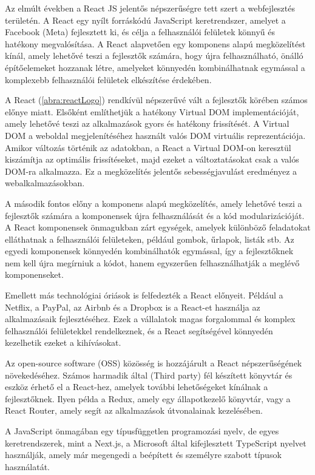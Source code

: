 Az elmúlt években a React JS jelentős népszerűségre tett szert a webfejlesztés területén. A React egy nyílt forráskódú JavaScript keretrendszer, amelyet a Facebook (Meta) fejlesztett ki, és célja a felhasználói felületek könnyű és hatékony megvalósítása. A React alapvetően egy komponens alapú megközelítést kínál, amely lehetővé teszi a fejlesztők számára, hogy újra felhasználható, önálló építőelemeket hozzanak létre, amelyeket könnyedén kombinálhatnak egymással a komplexebb felhasználói felületek elkészítése érdekében.

A React (\ref{abra:reactLogo}) rendkívül népszerűvé vált a fejlesztők körében számos előnye miatt. Elsőként említhetjük a hatékony Virtual DOM implementációját, amely lehetővé teszi az alkalmazások gyors és hatékony frissítését. A Virtual DOM a weboldal megjelenítéséhez használt valós DOM virtuális reprezentációja. Amikor változás történik az adatokban, a React a Virtual DOM-on keresztül kiszámítja az optimális frissítéseket, majd ezeket a változtatásokat csak a valós DOM-ra alkalmazza. Ez a megközelítés jelentős sebességjavulást eredményez a webalkalmazásokban.

\pagebreak
A második fontos előny a komponens alapú megközelítés, amely lehetővé teszi a fejlesztők számára a komponensek újra felhasználását és a kód modularizációját. A React komponensek önmagukban zárt egységek, amelyek különböző feladatokat elláthatnak a felhasználói felületeken, például gombok, űrlapok, listák stb. Az egyedi komponensek könnyedén kombinálhatók egymással, így a fejlesztőknek nem kell újra megírniuk a kódot, hanem egyszerűen felhasználhatják a meglévő komponenseket.

Emellett más technológiai óriások is felfedezték a React előnyeit. Például a Netflix, a PayPal, az Airbnb és a Dropbox is a React-et használja az alkalmazásaik fejlesztéséhez. Ezek a vállalatok magas forgalommal és komplex felhasználói felületekkel rendelkeznek, és a React segítségével könnyedén kezelhetik ezeket a kihívásokat.

Az open-source software (OSS) közösség is hozzájárult a React népszerűségének növekedéséhez. Számos harmadik által (Third party) fél készített könyvtár és eszköz érhető el a React-hez, amelyek további lehetőségeket kínálnak a fejlesztőknek. Ilyen példa a Redux, amely egy állapotkezelő könyvtár, vagy a React Router, amely segít az alkalmazások útvonalainak kezelésében.

A JavaScript önmagában egy típusfüggetlen programozási nyelv, de egyes keretrendszerek, mint a Next.js, a Microsoft által kifejlesztett TypeScript nyelvet használják, amely már megengedi a beépített és személyre szabott típusok használatát.

